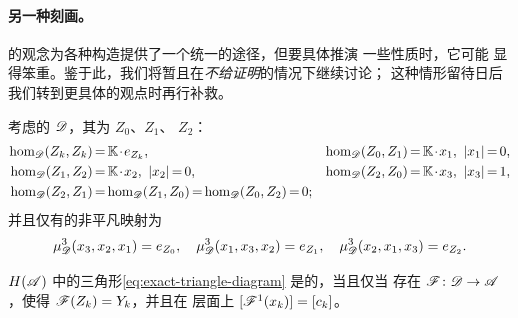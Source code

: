 \paragraph{另一种刻画。}\label{sub:another-characterization}
\trQuasiRepresent{}\trObject{}的观念为各种构造提供了一个统一的途径，但要具体推演
一些性质时，它可能
显得笨重。鉴于此，我们将暂且在\emph{不给证明}的情况下继续讨论\trExactTriangle；
这种情形留待日后我们转到更具体的观点时再行补救。

考虑\trStrictlyUnital{}的 \trACategory{} $\mathscr{D}$，其\trObject{}为 $Z_0$、$Z_1$、
$Z_2$：
\begin{equation*}
\medmuskip=1.5mu\relax\thickmuskip=3mu\relax
\begin{aligned}
\hom_{\scr{D}}(Z_k,Z_k)&=\KK\cdot e_{Z_k},
& \hom_{\scr{D}}(Z_0,Z_1)&=\KK\cdot x_1,\ |x_1|=0,\\
\hom_{\scr{D}}(Z_1,Z_2)&=\KK\cdot x_2,\ |x_2|=0,
& \hom_{\scr{D}}(Z_2,Z_0)&=\KK\cdot x_3,\ |x_3|=1,\\
\hom_{\scr{D}}(Z_2,Z_1)&=\hom_{\scr{D}}(Z_1,Z_0)=\hom_{\scr{D}}(Z_0,Z_2)=0;
\end{aligned}
\end{equation*}
并且仅有的非平凡\trComposition{}映射为
\begin{equation*}
\mu^3_{\mathscr{D}}(x_3,x_2,x_1)=e_{Z_0},\quad
\mu^3_{\mathscr{D}}(x_1,x_3,x_2)=e_{Z_1},\quad
\mu^3_{\mathscr{D}}(x_2,x_1,x_3)=e_{Z_2}.
\end{equation*}

\begin{proposition}\label{thm:exact-triangle-functor-characterization}
$H(\mathscr{A})$ 中的三角形\eqref{eq:exact-triangle-diagram} 是\trExact{}的，当且仅当
存在\trAFunctor{} $\mathscr{F}\colon\mathscr{D}\to\mathscr{A}$，使得 $\mathscr{F}(Z_k)=Y_k$，并且在%
\trCohomology{}层面上 $[\mathscr{F}^1(x_k)]=[c_k]$。
\end{proposition}

